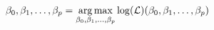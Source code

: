 \documentclass[preview]{standalone}
\begin{document}
\begin{align*}
\special{dvisvgm:raw <g id='unique000'>}\beta_0, \beta_1, \dots, \beta_p=\underset{\beta_0, \beta_1, \dots, \beta_p}{\arg\max}\log(\mathcal{L})(\beta_0, \beta_1, \dots, \beta_p)\special{dvisvgm:raw </g>}
\end{align*}
\end{document}
